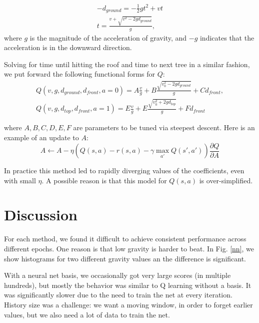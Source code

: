 \documentclass[11pt]{article}
\begin{document}
\begin{gather}
-d_{ground} = -\frac{1}{2}gt^2+vt\\
t = \frac{v+\sqrt{v^2-2gd_{ground}}}{g},
\end{gather}
where $g$ is the magnitude of the acceleration of gravity, and $-g$ indicates that the acceleration is in the downward direction.

Solving for time until hitting the roof and time to next tree in a similar fashion, we put forward the following functional forms for $Q$:
\begin{gather}
Q(v, g, d_{ground},d_{front}, a= 0) = A\frac{v}{g}+B\frac{\sqrt{v_0^2-2gd_{ground}}}{g}+Cd_{front},\\
Q(v, g, d_{top},d_{front}, a=1) = E\frac{v}{g}+E\frac{\sqrt{v_0^2+2gd_{top}}}{g}+Fd_{front}
\end{gather}

where $A,B,C,D,E,F$ are parameters to be tuned via steepest descent. Here is an example of an update to $A$:
\begin{equation}
A\leftarrow A-\eta(Q(s,a)-r(s,a)-\gamma\max_{a'}Q(s',a'))\frac{\partial Q}{\partial A}
\end{equation}

In practice this method led to rapidly diverging values of the coefficients, even with small $\eta$. A possible reason is that this model for $Q(s,a)$ is over-simplified.

\subsection{}

\section{Discussion} 
For each method, we found it difficult to achieve consistent performance across different epochs. One reason is that low gravity is harder to beat. In Fig. \ref{nn}, we show histograms for two different gravity values an the difference is significant.

With a neural net basis, we occasionally got very large scores (in multiple hundreds), but mostly the behavior was similar to Q learning without a basis. It was significantly slower due to the need to train the net at every iteration. History size was a challenge: we want a moving window, in order to forget earlier values, but we also need a lot of data to train the net. 
\paragraph{}
\end{document}

